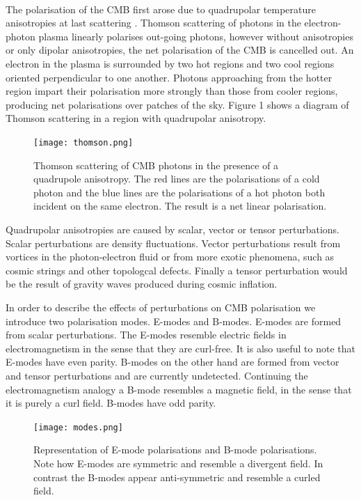 \\The polarisation of the CMB first arose due to quadrupolar temperature anisotropies at last scattering \cite{Hu:1997hv}. Thomson scattering of photons in the electron-photon plasma linearly polarises out-going photons, however without anisotropies or only dipolar anisotropies, the net polarisation of the CMB is cancelled out. An electron in the plasma is surrounded by two hot regions and two cool regions oriented perpendicular to one another. Photons approaching from the hotter region impart their polarisation more strongly than those from cooler regions, producing net polarisations over patches of the sky. Figure 1 shows a diagram of Thomson scattering in a region with quadrupolar anisotropy.

\begin{figure}[h]
\centering
\texttt{[image: thomson.png]}
\caption{Thomson scattering of CMB photons in the presence of a quadrupole anisotropy. The red lines are the polarisations of a cold photon and the blue lines are the polarisations of a hot photon both incident on the same electron. The result is a net linear polarisation.}
\label{fig:thomson}
\end{figure}
\pagebreak
Quadrupolar anisotropies are caused by scalar, vector or tensor perturbations. Scalar perturbations are density fluctuations. Vector perturbations result from vortices in the photon-electron fluid or from more exotic phenomena, such as cosmic strings and other topologcal defects. Finally a tensor perturbation would be the result of gravity waves produced during cosmic inflation.  

In order to describe the effects of perturbations on CMB polarisation we introduce two polarisation modes. E-modes and B-modes. E-modes are formed from scalar perturbations. The E-modes resemble electric fields in electromagnetism in the sense that they are curl-free. It is also useful to note that E-modes have even parity. B-modes on the other hand are formed from vector and tensor perturbations and are currently undetected. Continuing the electromagnetism analogy a B-mode resembles a magnetic field, in the sense that it is purely a curl field. B-modes have odd parity.

\begin{figure}
\centering
\texttt{[image: modes.png]}
\caption{Representation of E-mode polarisations and B-mode polarisations. Note how E-modes are symmetric and resemble a divergent field. In contrast the B-modes appear anti-symmetric and resemble a curled field.}
\label{fig:modes}
\end{figure}


